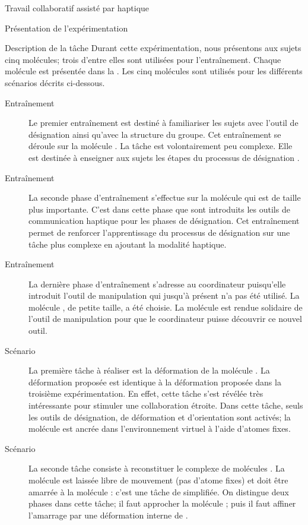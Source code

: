 \documentclass[myfrancais,ngerman,english,french]{mythesis}
\begin{document}
\begin{mychapter}{Travail collaboratif assisté par haptique}
\begin{mysection}{Présentation de l'expérimentation}
\begin{mysubsection}{Description de la tâche}
				Durant cette expérimentation, nous présentons aux sujets cinq molécules; trois d'entre elles sont utilisées pour l'entraînement.
				Chaque molécule est présentée dans la .
				Les cinq molécules sont utilisés pour les différents scénarios décrits ci-dessous.
				\begin{description}
					\item[Entraînement~]
						Le premier entraînement est destiné à familiariser les sujets avec l'outil de désignation ainsi qu'avec la structure du groupe.
						Cet entraînement se déroule sur la molécule \myTRPCAGE.
						La tâche est volontairement peu complexe.
						Elle est destinée à enseigner aux sujets les étapes du processus de désignation .
					\item[Entraînement~]
						La seconde phase d'entraînement s'effectue sur la molécule \myPrion qui est de taille plus importante.
						C'est dans cette phase que sont introduits les outils de communication haptique pour les phases de désignation.
						Cet entraînement permet de renforcer l'apprentissage du processus de désignation sur une tâche plus complexe en ajoutant la modalité haptique.
					\item[Entraînement~]
						La dernière phase d'entraînement s'adresse au coordinateur puisqu'elle introduit l'outil de manipulation qui jusqu'à présent n'a pas été utilisé.
						La molécule \myTRPZIPPER, de petite taille, a été choisie.
						La molécule est rendue solidaire de l'outil de manipulation pour que le coordinateur puisse découvrir ce nouvel outil.
					\item[Scénario~]
						La première tâche à réaliser est la déformation de la molécule \myUbiquitin.
						La déformation proposée est identique à la déformation proposée dans la troisième expérimentation.
						En effet, cette tâche s'est révélée très intéressante pour stimuler une collaboration étroite.
						Dans cette tâche, seuls les outils de désignation, de déformation et d'orientation sont activés; la molécule \myUbiquitin est ancrée dans l'environnement virtuel à l'aide d'atomes fixes.
					\item[Scénario~]
						La seconde tâche consiste à reconstituer le complexe de molécules \myNusENusG.
						La molécule \myNusG est laissée libre de mouvement (pas d'atome fixes) et doit être amarrée à la molécule \myNusE : c'est une tâche de  simplifiée.
						On distingue deux phases dans cette tâche; il faut approcher la molécule \myNusG; puis il faut affiner l'amarrage par une déformation interne de \myNusG.

\end{description}
\end{mysubsection}
\end{mysection}
\end{mychapter}
\end{document}
